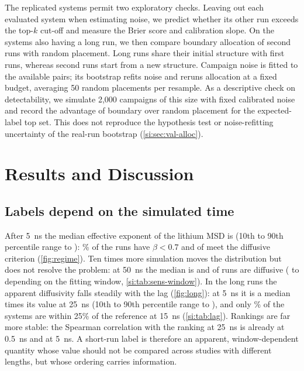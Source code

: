 \documentclass[preprint,12pt]{elsarticle}
\begin{document}
The replicated systems permit two exploratory checks. Leaving out each evaluated system when
estimating noise, we predict whether its other run exceeds the top-$k$ cut-off and measure
the Brier score and calibration slope. On the \valAlNCamp{} systems also having a long run,
we then compare boundary allocation of \valAlExtra{} second runs with random placement.
Long runs share their initial structure with first runs, whereas second runs start from a
new structure. Campaign noise is fitted to the available pairs; its bootstrap refits noise
and reruns allocation at a fixed budget, averaging 50 random placements per resample. As a
descriptive check on detectability, we simulate 2,000 campaigns of this size with fixed
calibrated noise and record the advantage of boundary over random placement for the
expected-label top set. This does not reproduce the hypothesis test or noise-refitting
uncertainty of the real-run bootstrap (\cref{si:sec:val-alloc}).

\section{Results and Discussion}\label{sec:results}
\subsection{Labels depend on the simulated time}\label{sec:res-time}
After \SI{5}{\nano\second} the median effective exponent of the lithium MSD is \betaShortMed{}
(10th to 90th percentile range \betaShortLo{} to \betaShortHi): \betaShortSubPct\% of the runs have $\beta<0.7$ and
\betaShortDiffN{} of \nShort{} meet the diffusive criterion (\cref{fig:regime}). Ten times more
simulation moves the distribution but does not resolve the problem: at \SI{50}{\nano\second} the
median is \betaLongMed{} and \betaLongDiffN{} of \nLong{} runs are diffusive
(\sensLongDiffMinN{} to \sensLongDiffMaxN{} depending on the fitting window, \cref{si:tab:sens-window}).
In the long runs the apparent diffusivity falls steadily with the lag (\cref{fig:long}): at
\SI{5}{\nano\second} it is a median \ratioFive{} times its value at \SI{25}{\nano\second}
(10th to 90th percentile range \ratioFiveLo{} to \ratioFiveHi), and only \withinFifteenPct\% of the systems are
within 25\% of the reference at \SI{15}{\nano\second} (\cref{si:tab:lag}). Rankings are far more
stable: the Spearman correlation with the ranking at \SI{25}{\nano\second} is \rhoHalf{} already at
\SI{0.5}{\nano\second} and \rhoFive{} at \SI{5}{\nano\second}. A short-run label is therefore an
apparent, window-dependent quantity whose value should not be compared across studies with
different lengths, but whose ordering carries information.
\end{document}
